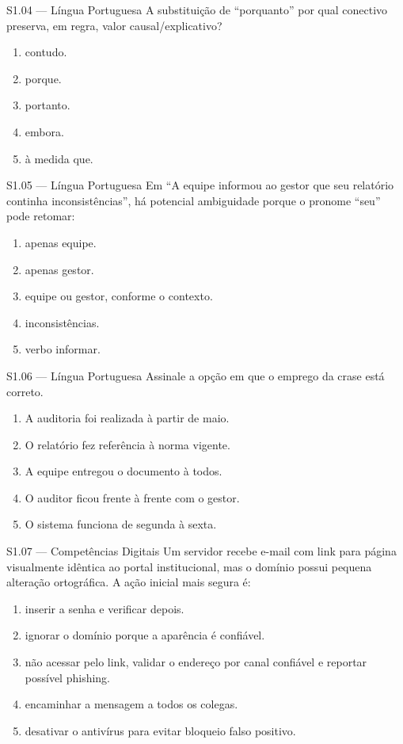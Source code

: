 \begin{questao}{S1.04 — Língua Portuguesa}
A substituição de ``porquanto'' por qual conectivo preserva, em regra, valor causal/explicativo?
\begin{enumerate}[label=\Alph*)]
\item contudo.
\item porque.
\item portanto.
\item embora.
\item à medida que.
\end{enumerate}
\end{questao}

\begin{questao}{S1.05 — Língua Portuguesa}
Em ``A equipe informou ao gestor que seu relatório continha inconsistências'', há potencial ambiguidade porque o pronome ``seu'' pode retomar:
\begin{enumerate}[label=\Alph*)]
\item apenas equipe.
\item apenas gestor.
\item equipe ou gestor, conforme o contexto.
\item inconsistências.
\item verbo informar.
\end{enumerate}
\end{questao}

\begin{questao}{S1.06 — Língua Portuguesa}
Assinale a opção em que o emprego da crase está correto.
\begin{enumerate}[label=\Alph*)]
\item A auditoria foi realizada à partir de maio.
\item O relatório fez referência à norma vigente.
\item A equipe entregou o documento à todos.
\item O auditor ficou frente à frente com o gestor.
\item O sistema funciona de segunda à sexta.
\end{enumerate}
\end{questao}

\begin{questao}{S1.07 — Competências Digitais}
Um servidor recebe e-mail com link para página visualmente idêntica ao portal institucional, mas o domínio possui pequena alteração ortográfica. A ação inicial mais segura é:
\begin{enumerate}[label=\Alph*)]
\item inserir a senha e verificar depois.
\item ignorar o domínio porque a aparência é confiável.
\item não acessar pelo link, validar o endereço por canal confiável e reportar possível phishing.
\item encaminhar a mensagem a todos os colegas.
\item desativar o antivírus para evitar bloqueio falso positivo.
\end{enumerate}
\end{questao}

